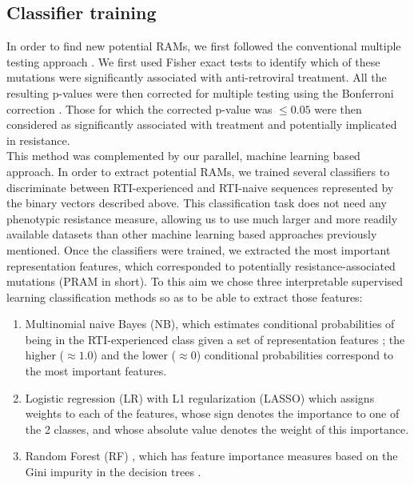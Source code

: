 \documentclass[
  11pt,
  twoside]{scrbook}
\begin{document}
\hypertarget{classifier-training}{%
\subsection{Classifier training}\label{classifier-training}}

In order to find new potential RAMs, we first followed the conventional
multiple testing approach \autocite{villabona-arenasIndepthAnalysisHIV12016}. We
first used Fisher exact tests to identify which of these mutations were
significantly associated with anti-retroviral treatment. All the
resulting p-values were then corrected for multiple testing using the
Bonferroni correction \autocite{goemanMultipleHypothesisTesting2014}. Those for
which the corrected p-value was \(≤ 0.05\) were then considered as
significantly associated with treatment and potentially implicated in
resistance.\\
This method was complemented by our parallel, machine learning based
approach. In order to extract potential RAMs, we trained several
classifiers to discriminate between RTI-experienced and RTI-naive
sequences represented by the binary vectors described above. This
classification task does not need any phenotypic resistance measure,
allowing us to use much larger and more readily available datasets than
other machine learning based approaches previously mentioned. Once the
classifiers were trained, we extracted the most important representation
features, which corresponded to potentially resistance-associated
mutations (PRAM in short). To this aim we chose three interpretable
supervised learning classification methods so as to be able to extract
those features:

\begin{enumerate}
\def\labelenumi{\arabic{enumi}.}
\item
  Multinomial naive Bayes (NB), which estimates conditional
  probabilities of being in the RTI-experienced class given a set of
  representation features \autocite{rennie2003tackling}; the higher
  (\(\approx 1.0\)) and the lower (\(\approx0\)) conditional probabilities
  correspond to the most important features.
\item
  Logistic regression (LR) with L1 regularization (LASSO)
  \autocite{tibshiraniRegressionShrinkageSelection1996} which assigns weights
  to each of the features, whose sign denotes the importance to one of
  the 2 classes, and whose absolute value denotes the weight of this
  importance.
\item
  Random Forest (RF) , which has feature importance measures based on
  the Gini impurity in the decision trees \autocite{breimanRandomForests2001}.
\end{enumerate}
\end{document}
